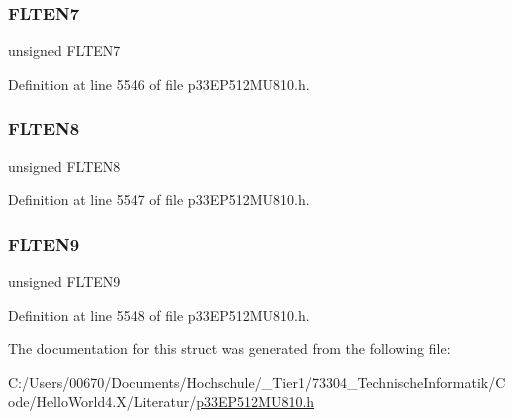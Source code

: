 \subsubsection{\texorpdfstring{F\+L\+T\+E\+N7}{FLTEN7}}
{\footnotesize\ttfamily unsigned F\+L\+T\+E\+N7}



Definition at line 5546 of file p33\+E\+P512\+M\+U810.\+h.

\mbox{\label{structtag_c2_f_e_n1_b_i_t_s_a3d4485461e50847e8dbe581c6a094df8}} 
\subsubsection{\texorpdfstring{F\+L\+T\+E\+N8}{FLTEN8}}
{\footnotesize\ttfamily unsigned F\+L\+T\+E\+N8}



Definition at line 5547 of file p33\+E\+P512\+M\+U810.\+h.

\mbox{\label{structtag_c2_f_e_n1_b_i_t_s_a55018b7d7f9966a022e6ce4585c68d78}} 
\subsubsection{\texorpdfstring{F\+L\+T\+E\+N9}{FLTEN9}}
{\footnotesize\ttfamily unsigned F\+L\+T\+E\+N9}



Definition at line 5548 of file p33\+E\+P512\+M\+U810.\+h.



The documentation for this struct was generated from the following file\+:\begin{DoxyCompactItemize}
\item 
C\+:/\+Users/00670/\+Documents/\+Hochschule/\+\_\+\+Tier1/73304\+\_\+\+Technische\+Informatik/\+Code/\+Hello\+World4.\+X/\+Literatur/\hyperlink{p33_e_p512_m_u810_8h}{p33\+E\+P512\+M\+U810.\+h}\end{DoxyCompactItemize}
